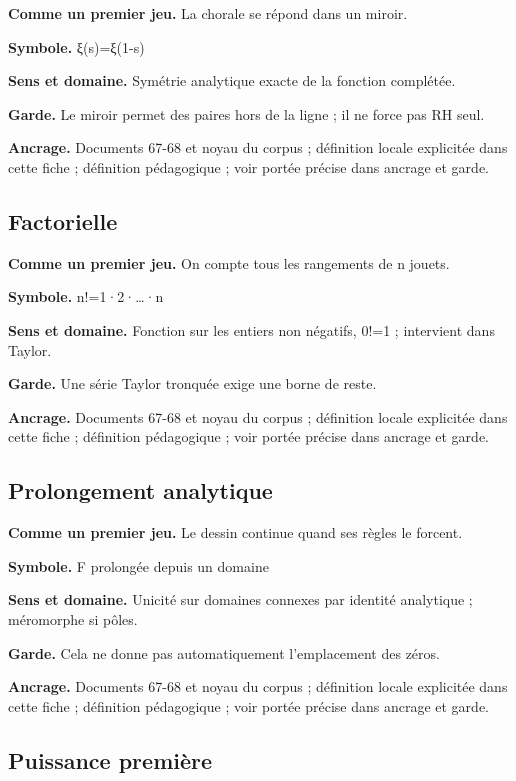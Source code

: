 \documentclass[
  9pt,
  a4paper,
]{article}
\begin{document}
\textbf{Comme un premier jeu.} La chorale se répond dans un miroir.

\textbf{Symbole.} ξ(s)=ξ(1-s)

\textbf{Sens et domaine.} Symétrie analytique exacte de la fonction
complétée.

\textbf{Garde.} Le miroir permet des paires hors de la ligne ; il ne
force pas RH seul.

\textbf{Ancrage.} Documents 67-68 et noyau du corpus ; définition locale
explicitée dans cette fiche ; définition pédagogique ; voir portée
précise dans ancrage et garde.

\hypertarget{factorielle}{%
\subsection{Factorielle}\label{factorielle}}

\textbf{Comme un premier jeu.} On compte tous les rangements de n
jouets.

\textbf{Symbole.} n!=1·2·\ldots·n

\textbf{Sens et domaine.} Fonction sur les entiers non négatifs, 0!=1 ;
intervient dans Taylor.

\textbf{Garde.} Une série Taylor tronquée exige une borne de reste.

\textbf{Ancrage.} Documents 67-68 et noyau du corpus ; définition locale
explicitée dans cette fiche ; définition pédagogique ; voir portée
précise dans ancrage et garde.

\hypertarget{prolongement-analytique}{%
\subsection{Prolongement analytique}\label{prolongement-analytique}}

\textbf{Comme un premier jeu.} Le dessin continue quand ses règles le
forcent.

\textbf{Symbole.} F prolongée depuis un domaine

\textbf{Sens et domaine.} Unicité sur domaines connexes par identité
analytique ; méromorphe si pôles.

\textbf{Garde.} Cela ne donne pas automatiquement l'emplacement des
zéros.

\textbf{Ancrage.} Documents 67-68 et noyau du corpus ; définition locale
explicitée dans cette fiche ; définition pédagogique ; voir portée
précise dans ancrage et garde.

\hypertarget{puissance-premiuxe8re}{%
\subsection{Puissance première}\label{puissance-premiuxe8re}}
\end{document}
